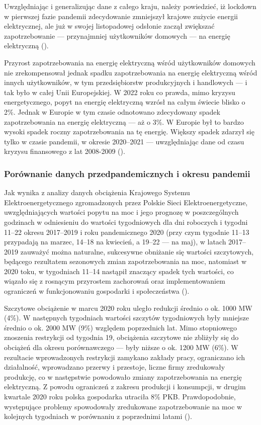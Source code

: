 \documentclass[polish, twoside, 12pt, a4paper]{article}
\theoremstyle{definition}
\theoremstyle{plain}
\theoremstyle{remark}
\begin{document}
Uwzględniając i generalizując dane z całego kraju, należy powiedzieć, iż lockdown w pierwszej fazie pandemii zdecydowanie zmniejszył krajowe zużycie energii elektrycznej, ale już w swojej listopadowej odsłonie zaczął zwiększać zapotrzebowanie --- przynajmniej użytkowników domowych --- na energię elektryczną (\cite{kazimierska2023}).

Przyrost zapotrzebowania na energię elektryczną wśród użytkowników domowych nie zrekompensował jednak spadku zapotrzebowania na energię elektryczną wśród innych użytkowników, w tym przedsiębiorstw produkcyjnych i handlowych --- i tak było w całej Unii Europejskiej. W 2022 roku co prawda, mimo kryzysu energetycznego, popyt na energię elektryczną wzrósł na całym świecie blisko o 2\%. Jednak w Europie w tym czasie odnotowano zdecydowany spadek zapotrzebowania na energię elektryczną --- aż o 3\%. W Europie był to bardzo wysoki spadek roczny zapotrzebowania na tę energię. Większy spadek zdarzył się tylko w czasie pandemii, w okresie 2020--2021 --- uwzględniając dane od czasu kryzysu finansowego z lat 2008-2009 (\cite{maciuch2023}).  

\subsubsection{Porównanie danych przedpandemicznych i okresu pandemii}

Jak wynika z analizy danych obciążenia Krajowego Systemu Elektroenergetycznego zgromadzonych przez Polskie Sieci Elektroenergetyczne, uwzględniających wartości popytu na moc i jego prognozę w poszczególnych godzinach w odniesieniu do wartości tygodniowych dla dni roboczych i tygodni 11--22 okresu 2017--2019 i roku pandemicznego 2020 (przy czym tygodnie 11--13 przypadają na marzec, 14--18 na kwiecień, a 19--22 --- na maj), w latach 2017--2019 zauważyć można naturalne, sukcesywne obniżanie się wartości szczytowych, będącego rezultatem sezonowych zmian zapotrzebowania na moc, natomiast w 2020 toku, w tygodniach 11--14 nastąpił znaczący spadek tych wartości, co wiązało się z rosnącym przyrostem zachorowań oraz implementowaniem ograniczeń w funkcjonowaniu gospodarki i społeczeństwa (\cite{stahl2021}). 

Szczytowe obciążenie w marcu 2020 roku uległo redukcji średnio o ok. 1000 MW (4\%). W następnych tygodniach wartości szczytów tygodniowych były mniejsze średnio o ok. 2000 MW (9\%) względem poprzednich lat. Mimo stopniowego znoszenia restrykcji od tygodnia 19, obciążenia szczytowe nie zbliżyły się do obciążeń dla okresu porównawczego --- były niższe o ok. 1200 MW (6\%). W rezultacie wprowadzonych restrykcji zamykano zakłady pracy, ograniczano ich działalność, wprowadzano przerwy i przestoje, liczne firmy zredukowały produkcję, co w następstwie powodowało zmiany zapotrzebowania na energię elektryczną. Z powodu ograniczeń z zakresu produkcji i konsumpcji, w drugim kwartale 2020 roku polska gospodarka utraciła 8\% PKB. Prawdopodobnie, występujące problemy spowodowały zredukowane zapotrzebowanie na moc w kolejnych tygodniach w porównaniu z poprzednimi latami (\cite{stahl2021}). 
\end{document}
